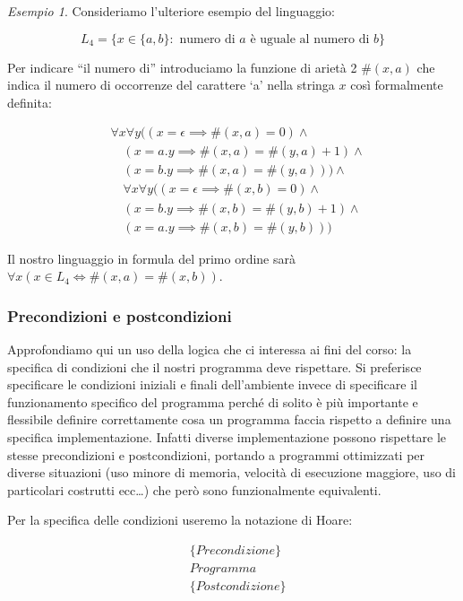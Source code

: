 \documentclass[a4paper,11pt,oneside]{article}
\theoremstyle{plain}
\theoremstyle{definition}
\theoremstyle{remark}
\newtheorem{esempio}{Esempio}[section]
\begin{document}
\begin{esempio}
  Consideriamo l'ulteriore esempio del linguaggio:

  \[
    L_4 = \{x \in \{a,b\} : \text{ numero di } a \text{ è uguale al numero di } b\}
  \]

  Per indicare ``il numero di'' introduciamo la funzione di arietà 2 $\#(x,a)$ che
  indica il numero di occorrenze del carattere `a' nella stringa $x$ così
  formalmente definita:

  \begin{align*}
    & \forall x \forall y ((x = \epsilon \implies \#(x,a)=0) \land \\
      & \quad (x = a.y \implies \#(x,a) = \#(y,a)+1) \land \\
      & \quad (x=b.y \implies \#(x,a) = \#(y,a))) \land \\
      & \quad \forall x \forall y ((x = \epsilon \implies \#(x,b)=0) \land \\
      & \quad (x = b.y \implies \#(x,b) = \#(y,b)+1) \land \\
      & \quad (x=a.y \implies \#(x,b) = \#(y,b)))
  \end{align*}

  Il nostro linguaggio in formula del primo ordine sarà
  $\forall x (x \in L_4 \iff \#(x,a)=\#(x,b))$.
\end{esempio}

\subsubsection{Precondizioni e postcondizioni}

Approfondiamo qui un uso della logica che ci interessa ai fini del corso: la
specifica di condizioni che il nostri programma deve rispettare. Si preferisce
specificare le condizioni iniziali e finali dell'ambiente invece di specificare
il funzionamento specifico del programma perché di solito è più importante e
flessibile definire correttamente cosa un programma faccia rispetto a definire
una specifica implementazione. Infatti diverse implementazione possono
rispettare le stesse precondizioni e postcondizioni, portando a programmi
ottimizzati per diverse situazioni (uso minore di memoria, velocità di
esecuzione maggiore, uso di particolari costrutti ecc\ldots) che però sono
funzionalmente equivalenti.

Per la specifica delle condizioni useremo la notazione di Hoare:

\begin{equation}
  \begin{aligned}
    & \{ \mathit{Precondizione} \} \\
    & \mathit{Programma} \\
    & \{ \mathit{Postcondizione} \}
  \end{aligned}
\end{equation}
\end{document}
